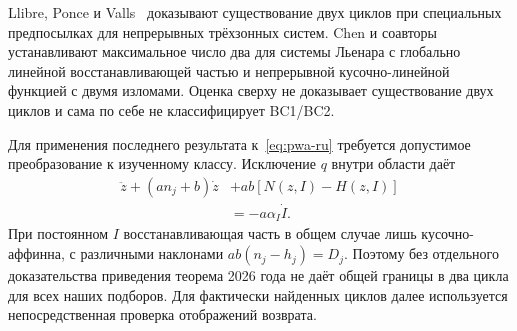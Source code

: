 Llibre, Ponce и Valls~\cite{LlibrePonceValls2015} доказывают существование двух циклов при специальных предпосылках для непрерывных трёхзонных систем. Chen и соавторы~\cite{ChenFengJiaMeng2026} устанавливают максимальное число два для системы Льенара с глобально линейной восстанавливающей частью и непрерывной кусочно-линейной функцией с двумя изломами. Оценка сверху не доказывает существование двух циклов и сама по себе не классифицирует BC1/BC2.

Для применения последнего результата к~\eqref{eq:pwa-ru} требуется допустимое преобразование к изученному классу. Исключение $q$ внутри области даёт
\begin{equation}
\begin{aligned}
\ddot z+(a n_j+b)\dot z&+ab[N(z,I)-H(z,I)]\\
 &=-a\alpha_I\dot I.
\end{aligned}
\end{equation}
При постоянном $I$ восстанавливающая часть в общем случае лишь кусочно-аффинна, с различными наклонами $ab(n_j-h_j)=D_j$. Поэтому без отдельного доказательства приведения теорема 2026 года не даёт общей границы в два цикла для всех наших подборов. Для фактически найденных циклов далее используется непосредственная проверка отображений возврата.

